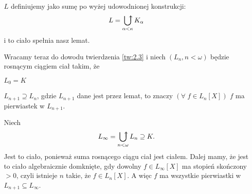 $L$ definiujemy jako sumę po wyżej udowodnionej konstrukcji:
$$L=\ubigcup\limits_{\alpha<\kappa}K_\alpha$$
i to ciało spełnia nasz lemat.
\smallskip

Wracamy teraz do dowodu twierdzenia \ref{tw:2.3} i niech $(L_n,n<\omega)$ będzie rosnącym ciągiem ciał takim, że

\indent \point $L_0=K$

\indent \point $L_{n+1}\supseteq L_n$, gdzie $L_{n+1}$ dane jest przez lemat, to znaczy $(\forall\;f\in L_n[X])$ $f$ ma pierwiastek w $L_{n+1}$.

Niech
$$L_\infty=\ubigcup\limits_{n<\omega}L_n\supseteq K.$$
Jest to ciało, ponieważ suma rosnącego ciągu ciał jest ciałem. Dalej mamy, że jest to ciało algebraicznie domknięte, gdy dowolny $f\in L_\infty [X]$ ma stopień skończony $>0$, czyli istnieje $n$ takie, że $f\in L_n[X]$. A więc $f$ ma wszystkie pierwiastki w $L_{n+1}\subseteq L_\infty$.
